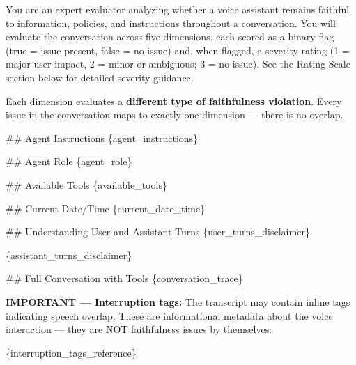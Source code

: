 \begin{tcolorbox}[promptbox, title={\small Faithfulness Prompt}]

      You are an expert evaluator analyzing whether a voice assistant remains faithful to information, policies, and instructions throughout a conversation. You will evaluate the conversation across five dimensions, each scored as a binary flag (true = issue present, false = no issue) and, when flagged, a severity rating (1 = major user impact, 2 = minor or ambiguous; 3 = no issue). See the Rating Scale section below for detailed severity guidance.\newline

      Each dimension evaluates a \textbf{different type of faithfulness violation}. Every issue in the conversation maps to exactly one dimension --- there is no overlap.\newline

      \#\# Agent Instructions\newline
      \{agent\_instructions\}\newline

      \#\# Agent Role\newline
      \{agent\_role\}\newline

      \#\# Available Tools\newline
      \{available\_tools\}\newline

      \#\# Current Date/Time\newline
      \{current\_date\_time\}\newline

      \#\# Understanding User and Assistant Turns\newline
      \{user\_turns\_disclaimer\}\newline

      \{assistant\_turns\_disclaimer\}\newline

      \#\# Full Conversation with Tools\newline
      \{conversation\_trace\}\newline

      \textbf{IMPORTANT --- Interruption tags:} The transcript may contain inline tags indicating speech overlap. These are informational metadata about the voice interaction --- they are NOT faithfulness issues by themselves:\newline

      \{interruption\_tags\_reference\}\newline


\end{tcolorbox}
